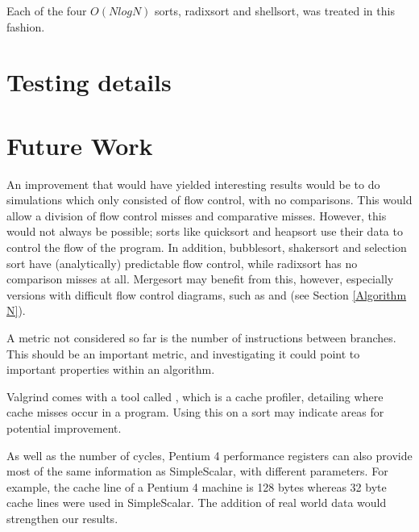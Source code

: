 Each of the four $O(NlogN)$ sorts, radixsort and shellsort, was treated in this fashion.

\section{Testing details}


\section{Future Work}
An improvement that would have yielded interesting results would be to do simulations
which only consisted of flow control, with no comparisons. This would allow a
division of flow control misses and comparative misses. However, this would not
always be possible; sorts like quicksort and heapsort use their data to
control the flow of the program. In addition, bubblesort, shakersort and
selection sort have (analytically) predictable flow control, while radixsort has
no comparison misses at all. Mergesort may benefit from this, however, especially versions
with difficult flow control diagrams, such as  and  (see Section \ref{Algorithm N}).

A metric not considered so far is the number of instructions between branches.
This should be an important metric, and investigating it could point to
important properties within an algorithm.

Valgrind comes with a tool called , which is a cache
profiler, detailing where cache misses occur in a program. Using this on a
sort may indicate areas for potential improvement.

As well as the number of cycles, Pentium 4 performance registers can also provide
most of the same information as SimpleScalar, with different parameters. For
example, the cache line of a Pentium 4 machine is 128 bytes whereas 32 byte
cache lines were used in SimpleScalar. The addition of real world data would
strengthen our results.
